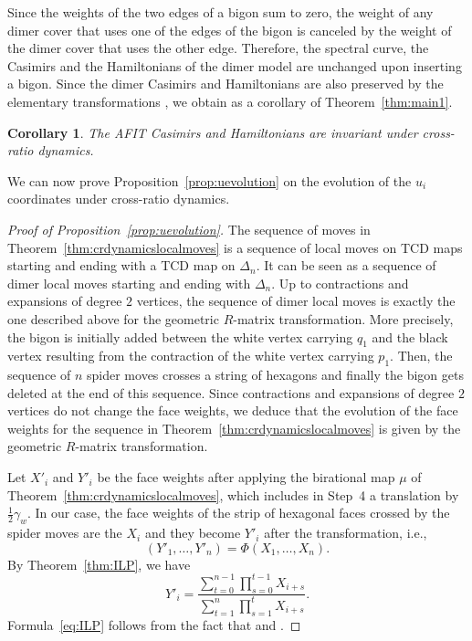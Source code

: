\documentclass[pdftex]{sigma}
\numberwithin{equation}{section}
\newtheorem{Corollary}[Theorem]{Corollary}
\begin{document}
Since the weights of the two edges of a bigon sum to zero, the weight of any dimer cover that uses one of the edges of the bigon is canceled by the weight of the dimer cover that uses the other edge. Therefore, the spectral curve, the Casimirs and the Hamiltonians of the dimer model are unchanged upon inserting a bigon. Since the dimer Casimirs and Hamiltonians are also preserved by the elementary transformations \cite[Theorem~4.7]{GK13}, we obtain as a corollary of Theorem~\ref{thm:main1}.

	\begin{Corollary}\label{cor:alternative}
		The AFIT Casimirs and Hamiltonians are invariant under cross-ratio dy\-namics.
	\end{Corollary}
	
	We can now prove Proposition~\ref{prop:uevolution} on the evolution of the $u_i$ coordinates under cross-ratio dynamics.
	
	\begin{proof}[Proof of Proposition~\ref{prop:uevolution}]
		
		The sequence of moves in Theorem~\ref{thm:crdynamicslocalmoves} is a sequence of local moves on TCD maps starting and ending with a TCD map on $\Delta_n$. It can be seen as a sequence of dimer local moves starting and ending with $\Delta_n$. Up to contractions and expansions of degree $2$ vertices, the sequence of dimer local moves is exactly the one described above for the geometric $R$-matrix transformation. More precisely, the bigon is initially added between the white vertex carrying $q_1$ and the black vertex resulting from the contraction of the white vertex carrying $p_1$. Then, the sequence of $n$ spider moves crosses a string of hexagons and finally the bigon gets deleted at the end of this sequence. Since contractions and expansions of degree $2$ vertices do not change the face weights, we deduce that the evolution of the face weights for the sequence in Theorem~\ref{thm:crdynamicslocalmoves} is given by the geometric $R$-matrix transformation.
		
		Let $X'_i$ and $Y'_i$ be the face weights after applying the birational map $\mu$ of Theorem~\ref{thm:crdynamicslocalmoves}, which includes in Step~4 a translation by $\tfrac{1}{2}\gamma_w$. In our case, the face weights of the strip of hexagonal faces crossed by the spider moves are the $X_i$ and they become $Y'_i$ after the transformation, i.e.,
		\[
		(Y'_1,\dots,Y'_n)=\Phi(X_1,\dots,X_n).
		\]
		By Theorem~\ref{thm:ILP}, we have
		\[
			Y'_i=\frac{\sum\limits_{t=0}^{n-1}\prod\limits_{s=0}^{t-1}X_{i+s}}{\sum\limits_{t=1}^{n}\prod\limits_{s=1}^{t}X_{i+s}}.
		\]
		Formula~\eqref{eq:ILP} follows from the fact that  and .
	\end{proof}
	
\end{document}
